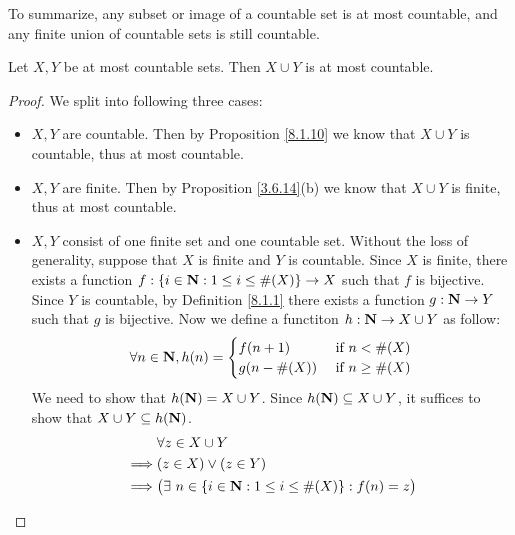 \begin{note}
    To summarize, any subset or image of a countable set is at most countable, and any finite union of countable sets is still countable.
\end{note}

\begin{additional corollary}\label{ac 8.1.1}
Let \(X, Y\) be at most countable sets.
Then \(X \cup Y\) is at most countable.
\end{additional corollary}

\begin{proof}
    We split into following three cases:
    \begin{itemize}
        \item \(X, Y\) are countable.
              Then by Proposition \ref{8.1.10} we know that \(X \cup Y\) is countable, thus at most countable.
        \item \(X, Y\) are finite.
              Then by Proposition \ref{3.6.14}(b) we know that \(X \cup Y\) is finite, thus at most countable.
        \item \(X, Y\) consist of one finite set and one countable set.
              Without the loss of generality, suppose that \(X\) is finite and \(Y\) is countable.
              Since \(X\) is finite, there exists a function \(f : \{i \in \mathbf{N} : 1 \leq i \leq \#(X)\} \to X\) such that \(f\) is bijective.
              Since \(Y\) is countable, by Definition \ref{8.1.1} there exists a function \(g : \mathbf{N} \to Y\) such that \(g\) is bijective.
              Now we define a functiton \(h : \mathbf{N} \to X \cup Y\) as follow:
              \[
                  \forall n \in \mathbf{N}, h(n) = \begin{cases}
                      f(n + 1)     & \text{ if } n < \#(X)    \\
                      g(n - \#(X)) & \text{ if } n \geq \#(X)
                  \end{cases}
              \]
              We need to show that \(h(\mathbf{N}) = X \cup Y\).
              Since \(h(\mathbf{N}) \subseteq X \cup Y\), it suffices to show that \(X \cup Y \subseteq h(\mathbf{N})\).
              \begin{align*}
                           & \forall z \in X \cup Y                                                 \\
                  \implies & (z \in X) \lor (z \in Y)                                               \\
                  \implies & \big(\exists\ n \in \{i \in \N : 1 \leq i \leq \#(X)\} : f(n) = z\big) \\

\end{align*}
\end{itemize}
\end{proof}
